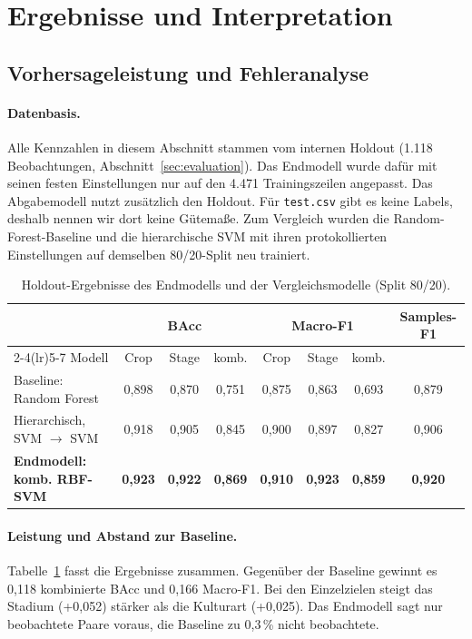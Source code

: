 \documentclass[11pt,a4paper,titlepage]{article}
\begin{document}
\section{Ergebnisse und Interpretation}
\label{sec:ergebnisse}

\subsection{Vorhersageleistung und Fehleranalyse}

\paragraph{Datenbasis.}
Alle Kennzahlen in diesem Abschnitt stammen vom internen Holdout
(1.118 Beobachtungen, Abschnitt~\ref{sec:evaluation}). Das Endmodell wurde
daf\"ur mit seinen festen Einstellungen nur auf den 4.471 Trainingszeilen
angepasst. Das Abgabemodell nutzt zus\"atzlich den Holdout. F\"ur
\texttt{test.csv} gibt es keine Labels, deshalb nennen wir dort keine
G\"utema\ss e. Zum Vergleich wurden die Random-Forest-Baseline und die
hierarchische SVM mit ihren protokollierten Einstellungen auf demselben
80/20-Split neu trainiert.

\begin{table}[H]
\centering
\caption{Holdout-Ergebnisse des Endmodells und der Vergleichsmodelle (Split 80/20).}
\label{tab:ergebnisse}
\small
\setlength{\tabcolsep}{4pt}
\begin{tabular}{@{}lccccccc@{}}
	\toprule
	& \multicolumn{3}{c}{BAcc} & \multicolumn{3}{c}{Macro-F1} & Samples-F1 \\
	\cmidrule(lr){2-4}\cmidrule(lr){5-7}
	Modell & Crop & Stage & komb. & Crop & Stage & komb. & \\
	\midrule
	Baseline: Random Forest & 0,898 & 0,870 & 0,751 & 0,875 & 0,863 & 0,693 & 0,879 \\
	Hierarchisch, SVM $\to$ SVM & 0,918 & 0,905 & 0,845 & 0,900 & 0,897 & 0,827 & 0,906 \\
	\textbf{Endmodell: komb. RBF-SVM} & \textbf{0,923} & \textbf{0,922} &
		\textbf{0,869} & \textbf{0,910} & \textbf{0,923} & \textbf{0,859} & \textbf{0,920} \\
	\bottomrule
\end{tabular}
\end{table}

\paragraph{Leistung und Abstand zur Baseline.}
Tabelle~\ref{tab:ergebnisse} fasst die Ergebnisse zusammen. Gegen\"uber der Baseline gewinnt es 0,118
kombinierte BAcc und 0,166 Macro-F1. Bei den Einzelzielen steigt das
Stadium (+0,052) st\"arker als die Kulturart (+0,025). Das Endmodell sagt nur beobachtete Paare voraus,
die Baseline zu 0,3\,\% nicht beobachtete.
\end{document}
